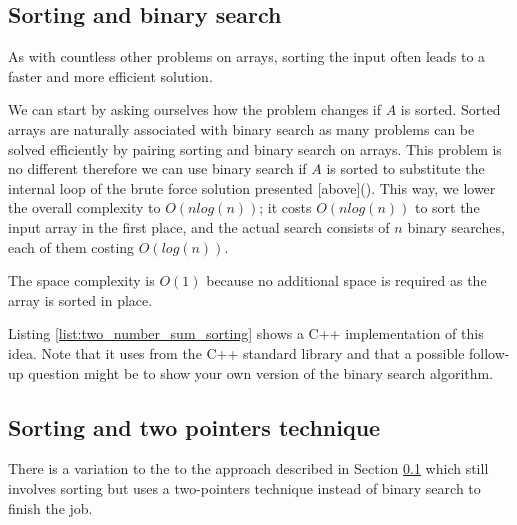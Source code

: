 \subsection{Sorting and binary search}
\label{sect:two_number_problem_binary_search}

As with countless other problems on arrays, sorting the input often leads to a faster and more efficient solution. 

We can start by asking ourselves how the problem changes if  $A$ is sorted. Sorted arrays are naturally associated with binary search as many problems can be solved efficiently by pairing sorting and binary search on arrays. 
This problem is no different therefore we can use binary search if $A$ is sorted to substitute the internal loop of the brute force solution presented [above](). This way, we lower the overall complexity  to $O(n log(n))$; it costs
$O(n log(n))$ to sort the input array in the first place, and the actual search consists of $n$ binary
searches, each of them costing $O(log(n))$. 

The space complexity is $O(1)$ because no additional space is required as the array is sorted in place.

Listing \ref{list:two_number_sum_sorting} shows a C++ implementation of this idea. Note that it uses  from the C++ standard library and that a possible follow-up question might be to show your own version of the binary search algorithm.






\subsection{Sorting and two pointers technique}
\label{sec:two_numbers:twopointers}

There is a variation to the to the approach described in Section
\ref{sect:two_number_problem_binary_search} which still involves sorting but uses a two-pointers
technique instead of binary search to finish the job. 

